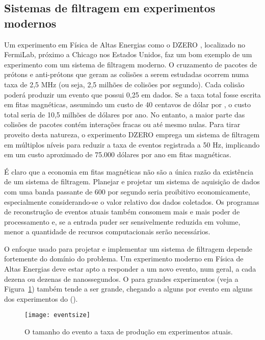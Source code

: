 \subsection{Sistemas de filtragem em experimentos modernos}

Um experimento em Física de Altas Energias como o DZERO \cite{d0}, localizado
no FermiLab, próximo a Chicago nos Estados Unidos, faz um bom exemplo de um
experimento com um sistema de filtragem moderno. O cruzamento de pacotes de
prótons e anti-prótons que geram as colisões a serem estudadas ocorrem numa
taxa de 2,5 MHz (ou seja, 2,5 milhões de colisões por segundo). Cada colisão
poderá produzir um evento que possui 0,25  em dados. Se a taxa
total fosse escrita em fitas magnéticas, assumindo um custo de 40 centavos de
dólar por , o custo total seria de 10,5 milhões de dólares por
ano. No entanto, a maior parte das colisões de pacotes contém interações
fracas ou até mesmo nulas. Para tirar proveito desta natureza, o experimento
DZERO emprega um sistema de filtragem em múltiplos níveis para reduzir a taxa
de eventos registrada a 50 Hz, implicando em um custo aproximado de 75.000
dólares por ano em fitas magnéticas.

É claro que a economia em fitas magnéticas não são a única razão da existência
de um sistema de filtragem. Planejar e projetar um sistema de aquisição de
dados com uma banda passante de 600  por segundo seria
proibitivo economicamente, especialmente considerando-se o valor relativo dos
dados coletados. Os programas de reconstrução de eventos atuais também
consomem mais e mais poder de processamento e, se a entrada puder ser
sensivelmente reduzida em volume, menor a quantidade de recursos
computacionais serão necessários.

O enfoque usado para projetar e implementar um sistema de filtragem depende
fortemente do domínio do problema. Um experimento moderno em Física de Altas
Energias deve estar apto a responder a um novo evento, num geral, a cada
dezena ou dezenas de nanossegundos. O  para grandes
experimentos (veja a Figura~\ref{fig:eventsize}) também tende a ser grande,
chegando a alguns
 por evento em alguns dos experimentos do 
().

\begin{figure}
\begin{center}
\texttt{[image: eventsize]}
\end{center}
\caption{O tamanho do evento  a taxa de produção em experimentos
atuais.}
\label{fig:eventsize}
\end{figure}

